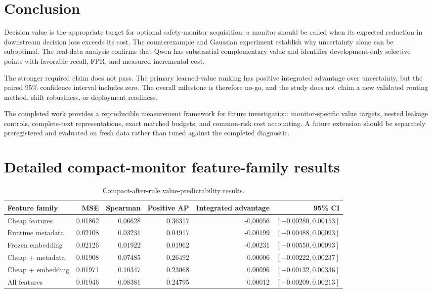 \documentclass[11pt,a4paper]{article}
\begin{document}
\section{Conclusion}

Decision value is the appropriate target for optional safety-monitor acquisition: a monitor should be called when its expected reduction in downstream decision loss exceeds its cost. The counterexample and Gaussian experiment establish why uncertainty alone can be suboptimal. The real-data analysis confirms that Qwen has substantial complementary value and identifies development-only selective points with favorable recall, FPR, and measured incremental cost.

The stronger required claim does not pass. The primary learned-value ranking has positive integrated advantage over uncertainty, but the paired 95\% confidence interval includes zero. The overall milestone is therefore no-go, and the study does not claim a new validated routing method, shift robustness, or deployment readiness.

The completed work provides a reproducible measurement framework for future investigation: monitor-specific value targets, nested leakage controls, complete-text representations, exact matched budgets, and common-risk cost accounting. A future extension should be separately preregistered and evaluated on fresh data rather than tuned against the completed diagnostic.

\appendix
\section{Detailed compact-monitor feature-family results}

\begin{table}[htbp]
\centering
\caption{Compact-after-rule value-predictability results.}
\small
\begin{tabularx}{\textwidth}{@{}Yrrrrr@{}}
\toprule
Feature family & MSE & Spearman & Positive AP & Integrated advantage & 95\% CI \\
\midrule
Cheap features & 0.01862 & 0.06628 & 0.36317 & -0.00056 & $[-0.00280,0.00153]$ \\
Runtime metadata & 0.02108 & 0.03231 & 0.04917 & -0.00199 & $[-0.00488,0.00093]$ \\
Frozen embedding & 0.02126 & 0.01922 & 0.01962 & -0.00231 & $[-0.00550,0.00093]$ \\
Cheap + metadata & 0.01908 & 0.07485 & 0.26492 & 0.00006 & $[-0.00222,0.00237]$ \\
Cheap + embedding & 0.01971 & 0.10347 & 0.23068 & 0.00096 & $[-0.00132,0.00336]$ \\
All features & 0.01946 & 0.08381 & 0.24795 & 0.00012 & $[-0.00209,0.00213]$ \\
\bottomrule
\end{tabularx}
\end{table}
\end{document}
